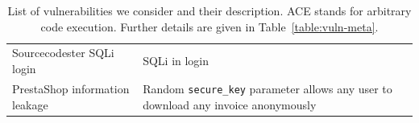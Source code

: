 \begin{table}[t!]
\begin{tabularx}{\textwidth}{lX}
Sourcecodester SQLi login & SQLi in login \\

PrestaShop information leakage & Random \texttt{secure\_key} parameter allows any user to download any invoice anonymously\\





\end{tabularx}


\caption{List of vulnerabilities we consider and their description. ACE stands
for arbitrary code execution. Further
details are given in Table~\ref{table:vuln-meta}.}
\label{table:vulns}


\end{table}

